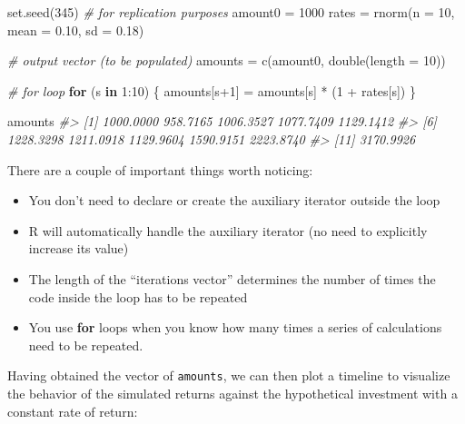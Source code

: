 \documentclass[
]{book}
\newenvironment{Shaded}{\begin{snugshade}}{\end{snugshade}}
\newcommand{\AttributeTok}[1]{\textcolor[rgb]{0.77,0.63,0.00}{#1}}
\newcommand{\CommentTok}[1]{\textcolor[rgb]{0.56,0.35,0.01}{\textit{#1}}}
\newcommand{\ControlFlowTok}[1]{\textcolor[rgb]{0.13,0.29,0.53}{\textbf{#1}}}
\newcommand{\DecValTok}[1]{\textcolor[rgb]{0.00,0.00,0.81}{#1}}
\newcommand{\FloatTok}[1]{\textcolor[rgb]{0.00,0.00,0.81}{#1}}
\newcommand{\FunctionTok}[1]{\textcolor[rgb]{0.00,0.00,0.00}{#1}}
\newcommand{\NormalTok}[1]{#1}
\newcommand{\OtherTok}[1]{\textcolor[rgb]{0.56,0.35,0.01}{#1}}
\newcommand{\SpecialCharTok}[1]{\textcolor[rgb]{0.00,0.00,0.00}{#1}}
\begin{document}
\begin{Shaded}
\begin{Highlighting}[]
\FunctionTok{set.seed}\NormalTok{(}\DecValTok{345}\NormalTok{)    }\CommentTok{\# for replication purposes}
\NormalTok{amount0 }\OtherTok{=} \DecValTok{1000}
\NormalTok{rates }\OtherTok{=} \FunctionTok{rnorm}\NormalTok{(}\AttributeTok{n =} \DecValTok{10}\NormalTok{, }\AttributeTok{mean =} \FloatTok{0.10}\NormalTok{, }\AttributeTok{sd =} \FloatTok{0.18}\NormalTok{)}

\CommentTok{\# output vector (to be populated)}
\NormalTok{amounts }\OtherTok{=} \FunctionTok{c}\NormalTok{(amount0, }\FunctionTok{double}\NormalTok{(}\AttributeTok{length =} \DecValTok{10}\NormalTok{))}

\CommentTok{\# for loop}
\ControlFlowTok{for}\NormalTok{ (s }\ControlFlowTok{in} \DecValTok{1}\SpecialCharTok{:}\DecValTok{10}\NormalTok{) \{}
\NormalTok{  amounts[s}\SpecialCharTok{+}\DecValTok{1}\NormalTok{] }\OtherTok{=}\NormalTok{ amounts[s] }\SpecialCharTok{*}\NormalTok{ (}\DecValTok{1} \SpecialCharTok{+}\NormalTok{ rates[s])}
\NormalTok{\}}

\NormalTok{amounts}
\CommentTok{\#\textgreater{}  [1] 1000.0000  958.7165 1006.3527 1077.7409 1129.1412}
\CommentTok{\#\textgreater{}  [6] 1228.3298 1211.0918 1129.9604 1590.9151 2223.8740}
\CommentTok{\#\textgreater{} [11] 3170.9926}
\end{Highlighting}
\end{Shaded}

There are a couple of important things worth noticing:

\begin{itemize}
\item
  You don't need to declare or create the auxiliary iterator outside the loop
\item
  R will automatically handle the auxiliary iterator (no need to explicitly
  increase its value)
\item
  The length of the ``iterations vector'' determines the number of times the code
  inside the loop has to be repeated
\item
  You use \textbf{for} loops when you know how many times a series of calculations
  need to be repeated.
\end{itemize}

Having obtained the vector of \texttt{amounts}, we can then plot a timeline to
visualize the behavior of the simulated returns against the hypothetical
investment with a constant rate of return:
\end{document}
